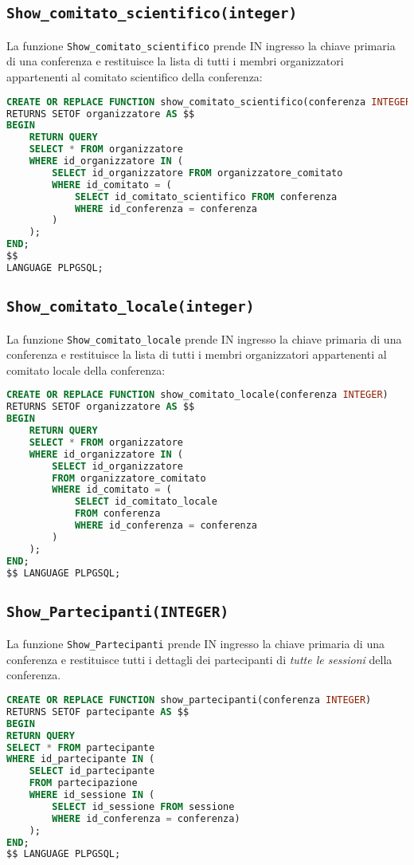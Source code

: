 \subsection{\texttt{Show\_comitato\_scientifico(integer)}}
La funzione \texttt{Show\_comitato\_scientifico} prende IN ingresso la chiave primaria di una conferenza e restituisce la lista di tutti i membri organizzatori appartenenti al comitato scientifico della conferenza:
\begin{lstlisting}[language=SQL, style=mystyle]
CREATE OR REPLACE FUNCTION show_comitato_scientifico(conferenza INTEGER)
RETURNS SETOF organizzatore AS $$
BEGIN
	RETURN QUERY
	SELECT * FROM organizzatore
	WHERE id_organizzatore IN (
		SELECT id_organizzatore FROM organizzatore_comitato
		WHERE id_comitato = (
			SELECT id_comitato_scientifico FROM conferenza
			WHERE id_conferenza = conferenza
		)
	);
END;
$$ 
LANGUAGE PLPGSQL;
\end{lstlisting}
\subsection{\texttt{Show\_comitato\_locale(integer)}}
La funzione \texttt{Show\_comitato\_locale} prende IN ingresso la chiave primaria di una conferenza e restituisce la lista di tutti i membri organizzatori appartenenti al comitato locale della conferenza:
\begin{lstlisting}[language=SQL, style=mystyle]
CREATE OR REPLACE FUNCTION show_comitato_locale(conferenza INTEGER)
RETURNS SETOF organizzatore AS $$
BEGIN
	RETURN QUERY
	SELECT * FROM organizzatore
	WHERE id_organizzatore IN (
		SELECT id_organizzatore 
		FROM organizzatore_comitato
		WHERE id_comitato = (
			SELECT id_comitato_locale 
			FROM conferenza
			WHERE id_conferenza = conferenza
		)
	);
END;
$$ LANGUAGE PLPGSQL;
\end{lstlisting}
\subsection{\texttt{Show\_Partecipanti(INTEGER)}}
La funzione \texttt{Show\_Partecipanti} prende IN ingresso la chiave primaria di una conferenza e restituisce tutti i dettagli dei partecipanti di \textit{tutte le sessioni} della conferenza.
\begin{lstlisting}[language=SQL,style=mystyle]
CREATE OR REPLACE FUNCTION show_partecipanti(conferenza INTEGER)
RETURNS SETOF partecipante AS $$
BEGIN
RETURN QUERY
SELECT * FROM partecipante
WHERE id_partecipante IN (
	SELECT id_partecipante 
	FROM partecipazione
	WHERE id_sessione IN (
		SELECT id_sessione FROM sessione
		WHERE id_conferenza = conferenza)
	);
END;
$$ LANGUAGE PLPGSQL;
\end{lstlisting}
